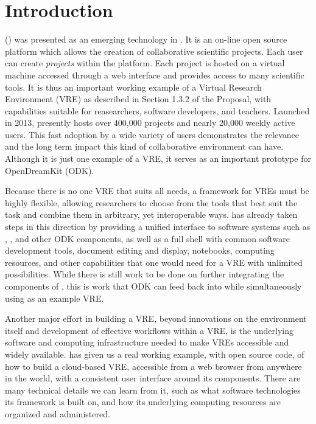 \documentclass{deliverablereport}
\author{Erik Bray}
\renewcommand{\SMC}{\software{SMC}}
\begin{document}
\maketitle
\strut\githubissuedescription
\newpage\tableofcontents\newpage

\section{Introduction}

 (\SMC) was presented as an emerging technology in
. It is an on-line open source platform which allows
the creation of collaborative scientific projects. Each user can create
\emph{projects} within the platform. Each project is hosted on a \Linux virtual
machine accessed through a web interface and provides access to many scientific
tools.  It is thus an important working example of a Virtual Research
Environment (VRE) as described in Section 1.3.2 of the Proposal, with
capabilities suitable for reasearchers, software developers, and teachers.
Launched in 2013, \SMC presently hosts over 400,000 projects and nearly 20,000
weekly active users. This fast adoption by a wide variety of users demonstrates
the relevance and the long term impact this kind of collaborative environment
can have.  Although it is just one example of a VRE, it serves as an important
prototype for OpenDreamKit (ODK).

Because there is no one VRE that suits all needs, a framework for VREs must be
highly flexible, allowing researchers to choose from the tools that best suit
the task and combine them in arbitrary, yet interoperable ways.  \SMC has
already taken steps in this direction by providing a unified interface to
software systems such as \Sage, \GAP, and other ODK components, as
well as a full \Linux shell with common software development tools, \LATEX
document editing and display, \Jupyter notebooks, computing resources, and
other capabilities that one would need for a VRE with unlimited possibilities.
While there is still work to be done on further integrating the components of
\SMC, this is work that ODK can feed back into \SMC while
simultaneously using \SMC as an example VRE.

Another major effort in building a VRE, beyond innovations on the environment
itself and development of effective workflows within a VRE, is the underlying
software and computing infrastructure needed to make VREs accessible and widely
available.  \SMC has given us a real working example, with open source code, of
how to build a cloud-based VRE, accessible from a web browser from anywhere in
the world, with a consistent user interface around its components.  There are
many technical details we can learn from it, such as what software technologies
its framework is built on, and how its underlying computing resources are
organized and administered.
\end{document}
